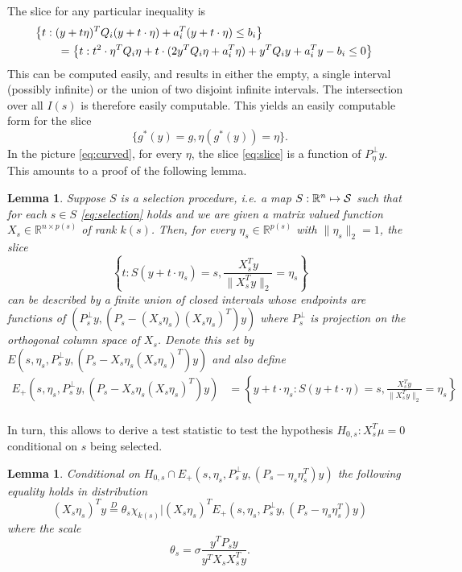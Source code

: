\documentclass{imsart}
\newcommand{\real}{\mathbb{R}}
\newtheorem{lemma}[theorem]{Lemma}
\begin{document}
The slice for any particular inequality is
$$
\begin{aligned}
\lefteqn{
\left\{t: (y+t\eta)^T Q_i (y+t \cdot \eta) + a_i^T(y+t \cdot \eta) \leq b_i\right\}} \\
 & \qquad = \left\{t: t^2 \cdot \eta^TQ_i\eta + t \cdot(2 y^TQ_i\eta + a_i^T\eta) + y^TQ_iy + a_i^Ty - b_i \leq 0 \right\} \\
\end{aligned}
$$
This can be computed easily, and results in either the empty, a single interval (possibly infinite) or the union of 
two disjoint infinite intervals. The intersection over all $I(s)$ is therefore easily computable.
This yields an easily computable form for the slice
\begin{equation}
\label{eq:slice}
\{g^*(y)=g, \eta(g^*(y))=\eta\}.
\end{equation}
In the picture \eqref{eq:curved}, for every $\eta$, the slice \eqref{eq:slice} is a function
of $P_{\eta}^{\perp}y$. This amounts to a proof of the following lemma.

\begin{lemma}
Suppose $S$ is a selection procedure, i.e. a map $S:\real^n \mapsto {\cal S}$
such that for each $s \in S$ \eqref{eq:selection} holds 
and we are given a matrix valued function $X_s \in \real^{n \times p(s)}$ of rank
$k(s)$.
Then, for every $\eta_s \in \real^{p(s)}$ with $\|\eta_s\|_2=1$, the
slice
\begin{equation}
\label{eq:slice:general}
\left\{t: S(y+t \cdot \eta_s)=s, \frac{X_s^Ty}{\|X_s^Ty\|_2}=\eta_s \right\}
\end{equation}
can be described by
a finite union of closed intervals whose endpoints are functions of 
$(P_s^{\perp}y, (P_s- (X_s\eta_s)(X_s\eta_s)^T)y)$ where
$P_s^{\perp}$ is projection on the orthogonal column space of $X_s$.
Denote this set by $E(s, \eta_s, P_s^{\perp}y, (P_s - X_s \eta_s(X_s\eta_s)^T)y)$ and also define
$$
\begin{aligned}
E_+(s, \eta_s, P_s^{\perp}y, (P_s - X_s \eta_s(X_s\eta_s)^T)y) &= \left\{y + t \cdot \eta_s: S(y+t \cdot \eta)=s, \frac{X_s^Ty}{\|X_s^Ty\|_2}=\eta_s \right\} \\
\end{aligned}
$$
\end{lemma}

In turn, this allows to derive a test statistic to test the hypothesis
$H_{0,s}:X_s^T\mu=0$ conditional on $s$ being selected.
\begin{lemma}
\label{eq:test:dbn}
Conditional on $H_{0,s} \cap E_+(s, \eta_s, P_s^{\perp}y, (P_s - \eta_s\eta_s^T)y)$
the following equality holds in distribution
\begin{equation}
\label{eq:chi:truncated}
(X_s\eta_s)^Ty \overset{D}{=} \theta_s \chi_{k(s)} | (X_s\eta_s)^TE_+(s, \eta_s, P_s^{\perp}y, (P_s - \eta_s\eta_s^T)y) 
\end{equation}
where the scale 
$$
\theta_s = \sigma \frac{y^TP_sy}{y^TX_sX_s^Ty}.
$$
\end{lemma}
\end{document}
